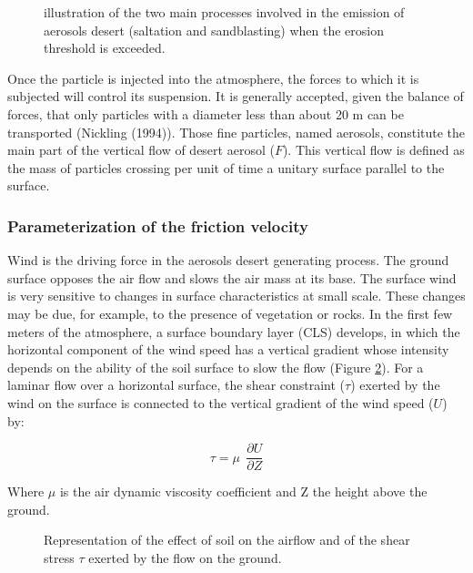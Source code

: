 \begin{figure}[h]
\begin{center}
\caption{illustration of the two main processes involved in the emission of aerosols desert (saltation and sandblasting) when the
erosion threshold is exceeded. \label{fig_chap5_1}}
\end{center}
\end{figure}

Once the particle is injected into the atmosphere, the forces to which it is subjected will
control its suspension. It is generally accepted, given the balance of forces, that only
particles with a diameter less than about 20 \textmu m can be transported (Nickling (1994)\nocite{Nickling1974}). 
Those fine particles, named aerosols, constitute the main part of the vertical flow of
desert aerosol ($F$). This vertical flow is defined as the mass of particles crossing per unit of time
a unitary surface parallel to the surface.

\subsubsection{Parameterization of the friction velocity}
Wind is the driving force in the aerosols desert generating process. The
ground surface opposes the air flow and slows the air mass at its base. The surface wind
is very sensitive to changes in surface characteristics at small
scale. These changes may be due, for example, to the presence of vegetation or
rocks. In the first few meters of the atmosphere, a surface boundary layer (CLS)
develops, in which the horizontal component of the wind speed has a
vertical gradient whose intensity depends on the ability of the soil surface to slow the
flow (Figure \ref{fig_chap5_2}). For a laminar flow over a horizontal surface, the
shear constraint ($\tau$) exerted by the wind on the surface is connected to the vertical gradient
of the wind speed ($U$) by:

\begin{equation}
\tau = \mu~~\frac{\partial U}{\partial Z}
\end{equation}
	
Where $\mu$ is the air dynamic viscosity coefficient and Z the height above the ground.

\begin{figure}[h]
\begin{center}
\caption{Representation of the effect of soil on the airflow and of the shear stress $\tau$ 
exerted by the flow on the ground. \label{fig_chap5_2}}
\end{center}
\end{figure}


